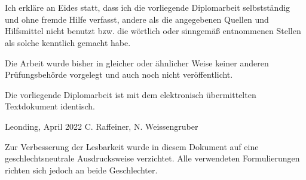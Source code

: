 \thispagestyle{empty}
\vspace{3cm}
~ \\ \\
Ich erkläre an Eides statt, dass ich die vorliegende Diplomarbeit selbstständig und ohne fremde Hilfe verfasst, andere als die angegebenen Quellen und Hilfsmittel nicht benutzt bzw. die wörtlich oder sinngemäß entnommenen Stellen als solche kenntlich gemacht habe.

Die Arbeit wurde bisher in gleicher oder ähnlicher Weise keiner anderen Prüfungsbehörde vorgelegt und auch noch nicht veröffentlicht.

Die vorliegende Diplomarbeit ist mit dem elektronisch übermittelten Textdokument identisch.
\vspace{3cm}
\begin{tabbing}
Leonding, April 2022 \hspace{5cm} C. Raffeiner, N. Weissengruber
\end{tabbing}
\vspace{10cm}
Zur Verbesserung der Lesbarkeit wurde in diesem Dokument auf eine geschlechtsneutrale Ausdrucksweise verzichtet.
Alle verwendeten Formulierungen richten sich jedoch an beide Geschlechter.
\newpage
\setcounter{page}{1}
